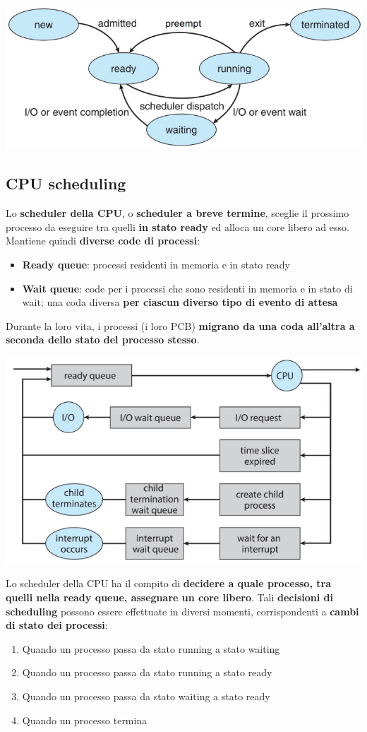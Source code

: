 \documentclass[12pt]{article}
\begin{document}
\begin{center}
    \includegraphics[width = 0.73\linewidth]{Images/39.png}
\end{center}
\subsection{CPU scheduling}
Lo \textbf{scheduler della CPU}, o \textbf{scheduler a breve termine}, sceglie il prossimo processo da eseguire tra quelli \textbf{in stato ready} ed alloca un core libero ad esso.
Mantiene quindi \textbf{diverse code di processi}:
\begin{itemize}
    \item \textbf{Ready queue}: processi residenti in memoria e in stato ready
    \item \textbf{Wait queue}: code per i processi che sono residenti in memoria e in stato di wait; una coda diversa \textbf{per ciascun diverso tipo di evento di attesa}
\end{itemize}
Durante la loro vita, i processi (i loro PCB) \textbf{migrano da una coda all'altra a seconda dello stato del processo stesso}.
\begin{center}
    \includegraphics[width = 0.60\linewidth]{Images/40.png}
\end{center}
Lo scheduler della CPU ha il compito di \textbf{decidere a quale processo, tra quelli nella ready queue, assegnare un core libero}.
Tali \textbf{decisioni di scheduling} possono essere effettuate in diversi momenti, corrispondenti a \textbf{cambi di stato dei processi}:
\begin{enumerate}
    \item Quando un processo passa da stato running a stato waiting
    \item Quando un processo passa da stato running a stato ready
    \item Quando un processo passa da stato waiting a stato ready
    \item Quando un processo termina
\end{enumerate}
\end{document}
